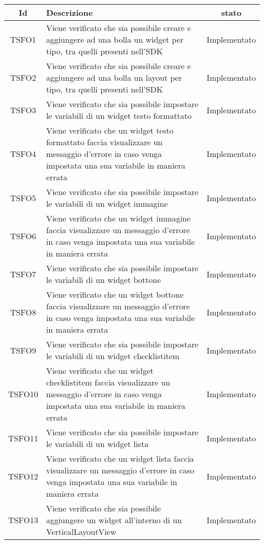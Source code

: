 \begin{center}
	\begin{longtable}{|c|>{\centering}m{10cm}|c|}\hline
		Id & Descrizione & stato \\ \hline
		TSFO1 & Viene verificato che sia possibile creare e aggiungere ad una bolla un widget per tipo, tra quelli presenti nell'SDK & Implementato \\ \hline
		TSFO2 & Viene verificato che sia possibile creare e aggiungere ad una bolla un layout per tipo, tra quelli presenti nell'SDK & Implementato \\ \hline
		TSFO3 & Viene verificato che sia possibile impostare le variabili di un widget testo formattato & Implementato \\ \hline
		TSFO4 & Viene verificato che un widget testo formattato faccia visualizzare un messaggio d'errore in caso venga impostata una sua variabile in maniera errata & Implementato \\ \hline
		TSFO5 & Viene verificato che sia possibile impostare le variabili di un widget immagine & Implementato \\ \hline
		TSFO6 & Viene verificato che un widget immagine faccia visualizzare un messaggio d'errore in caso venga impostata una sua variabile in maniera errata & Implementato \\ \hline
		TSFO7 & Viene verificato che sia possibile impostare le variabili di un widget bottone & Implementato \\ \hline
		TSFO8 & Viene verificato che un widget bottone faccia visualizzare un messaggio d'errore in caso venga impostata una sua variabile in maniera errata & Implementato \\ \hline
		TSFO9 & Viene verificato che sia possibile impostare le variabili di un widget checklistitem & Implementato \\ \hline
		TSFO10 & Viene verificato che un widget checklistitem faccia visualizzare un messaggio d'errore in caso venga impostata una sua variabile in maniera errata & Implementato \\ \hline
		TSFO11 & Viene verificato che sia possibile impostare le variabili di un widget lista & Implementato \\ \hline
		TSFO12 & Viene verificato che un widget lista faccia visualizzare un messaggio d'errore in caso venga impostata una sua variabile in maniera errata & Implementato \\ \hline
		TSFO13 & Viene verificato che sia possibile aggiungere un widget all'interno di un VerticalLayoutView & Implementato \\ \hline

\end{longtable}
\end{center}
